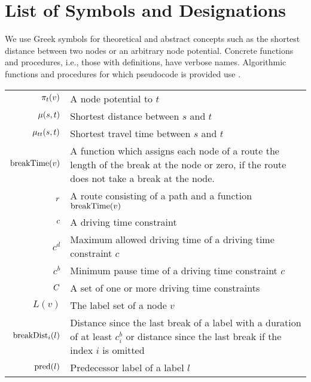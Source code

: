 \section{List of Symbols and Designations}
\label{app:symbols}

We use Greek symbols for theoretical and abstract concepts such as the shortest distance between two nodes or an arbitrary node potential. Concrete functions and procedures, i.e., those with definitions, have verbose names. Algorithmic functions and procedures for which pseudocode is provided use .

\begin{tabular}{rp{}}
	$\pi_t(v)$         & A node potential to $t$                                                                                                                    \\
	$\mu(s,t)$          & Shortest distance between $s$ and $t$                                                                                                      \\
	$\mu_{tt}(s,t)$        & Shortest travel time between $s$ and $t$                                                                                                   \\
	$\operatorname{breakTime}(v)$           & A function which assigns each node of a route the length of the break at the node or zero, if the route does not take a break at the node.
	\\
	$r$                  & A route consisting of a path and a function $\operatorname{breakTime}(v)$                                                                                \\
	$c$                  & A driving time constraint                                                                                                                  \\
	$c^d$                     & Maximum allowed driving time of a driving time constraint $c$                                                                              \\
	$c^b$                     & Minimum pause time of a driving time constraint $c$                                                                                   \\
	$C$               & A set of one or more driving time constraints                                                                                              \\
	$L(v)$                    & The label set of a node $v$                                                                                                                \\
	$\operatorname{breakDist}_i(l)$         & Distance since the last break of a label with a duration of at least $c_i^b$ or distance since the last break if the index $i$ is omitted  \\
	$\operatorname{pred}(l)$                & Predecessor label of a label $l$                                                                                                           \\


\end{tabular}
